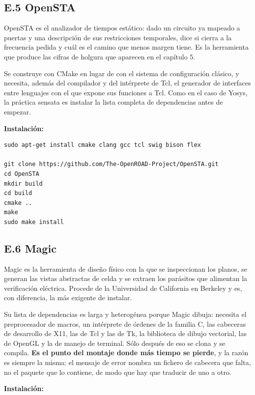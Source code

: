 \subsection{E.5 OpenSTA}\label{e.5-opensta}

OpenSTA es el analizador de tiempos estático: dado un circuito ya
mapeado a puertas y una descripción de sus restricciones temporales,
dice si cierra a la frecuencia pedida y cuál es el camino que menos
margen tiene. Es la herramienta que produce las cifras de holgura que
aparecen en el capítulo 5.

Se construye con CMake en lugar de con el sistema de configuración
clásico, y necesita, además del compilador y del intérprete de Tcl, el
generador de interfaces entre lenguajes con el que expone sus funciones
a Tcl. Como en el caso de Yosys, la práctica sensata es instalar la
lista completa de dependencias antes de empezar.

\textbf{Instalación:}

\begin{verbatim}
sudo apt-get install cmake clang gcc tcl swig bison flex

git clone https://github.com/The-OpenROAD-Project/OpenSTA.git
cd OpenSTA
mkdir build
cd build
cmake ..
make
sudo make install
\end{verbatim}

\subsection{E.6 Magic}\label{e.6-magic}

Magic es la herramienta de diseño físico con la que se inspeccionan los
planos, se generan las vistas abstractas de celda y se extraen los
parásitos que alimentan la verificación eléctrica. Procede de la
Universidad de California en Berkeley y es, con diferencia, la más
exigente de instalar.

Su lista de dependencias es larga y heterogénea porque Magic dibuja:
necesita el preprocesador de macros, un intérprete de órdenes de la
familia C, las cabeceras de desarrollo de X11, las de Tcl y las de Tk,
la biblioteca de dibujo vectorial, las de OpenGL y la de manejo de
terminal. Sólo después de eso se clona y se compila. \textbf{Es el punto
del montaje donde más tiempo se pierde}, y la razón es siempre la misma:
el mensaje de error nombra un fichero de cabecera que falta, no el
paquete que lo contiene, de modo que hay que traducir de uno a otro.

\textbf{Instalación:}

